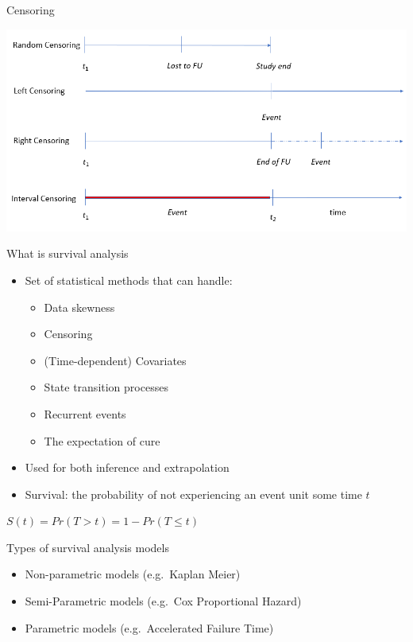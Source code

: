 \documentclass[
  ignorenonframetext,
]{beamer}
\providecommand{\tightlist}{%
  \setlength{\itemsep}{0pt}\setlength{\parskip}{0pt}}
\begin{document}
\begin{frame}{Censoring}
\protect\hypertarget{censoring}{}

\includegraphics[width=1\linewidth]{figures/censoring}

\end{frame}

\begin{frame}{What is survival analysis}
\protect\hypertarget{what-is-survival-analysis}{}

\begin{itemize}
\item
  Set of statistical methods that can handle:

  \begin{itemize}
  \tightlist
  \item
    Data skewness
  \item
    Censoring
  \item
    (Time-dependent) Covariates
  \item
    State transition processes
  \item
    Recurrent events
  \item
    The expectation of cure
  \end{itemize}
\item
  Used for both inference and extrapolation
\item
  Survival: the probability of not experiencing an event unit some time
  \(t\)
\end{itemize}

\(S(t) = Pr(T >t) = 1- Pr(T \leq t)\)

\end{frame}

\begin{frame}{Types of survival analysis models}
\protect\hypertarget{types-of-survival-analysis-models}{}

\begin{itemize}
\tightlist
\item
  Non-parametric models (e.g.~Kaplan Meier)
\item
  Semi-Parametric models (e.g.~Cox Proportional Hazard)
\item
  Parametric models (e.g.~Accelerated Failure Time)
\end{itemize}

\end{frame}
\end{document}
